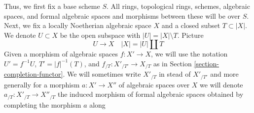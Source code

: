 \medskip\noindent
Thus, we first fix a base scheme $S$. All rings, topological rings,
schemes, algebraic spaces, and formal algebraic spaces and
morphisms between these will be over $S$. Next, we fix a
locally Noetherian algebraic space $X$ and a closed subset $T \subset |X|$.
We denote $U \subset X$ be the open subspace with $|U| = |X| \setminus T$.
Picture
$$
U \to X \quad |X| = |U| \amalg T
$$
Given a morphism of algebraic spaces $f : X' \to X$, we will use the notation
$U' = f^{-1}U$, $T' = |f|^{-1}(T)$, and $f_{/T} : X'_{/T'} \to X_{/T}$ as in
Section \ref{section-completion-functor}. We will sometimes write
$X'_{/T}$ in stead of $X'_{/T'}$ and more generally for a morphism
$a : X' \to X''$ of algebraic spaces over $X$ we will denote
$a_{/T} : X'_{/T} \to X''_{/T}$ the induced morphism of formal
algebraic spaces obtained by completing the morphism $a$ along
